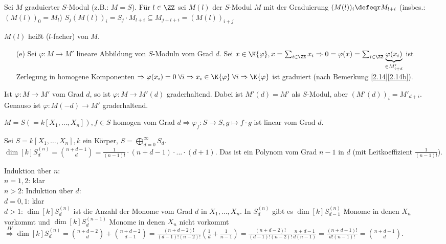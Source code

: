 \begin{nnBsp}
Sei $M$ graduierter $S$-Modul (z.B.: $M=S$). Für $l\in\ZZ$ sei
$M(l)$ der $S$-Modul $M$ mit der Graduierung $(M(l))_i\defeqr M_{l+i}$
(insbes.: $(M(l))_0=M_l$)
$S_j(M(l))_i=S_j\cdot M_{l+i}\subseteq M_{j+l+i}=(M(l))_{i+j}$

$M(l)$ heißt ($l$-facher)  von $M$.
\end{nnBsp}

\begin{Bew}
  \begin{enumerate}
    \item[(e)] Sei $\varphi: M \to M'$ lineare Abbildung von $S$-Moduln vom Grad
    $d$. Sei $x \in \K{\varphi}, x = \sum_{i \in \ZZ} x_i
    \Rightarrow 0 = \varphi(x) = \sum_{i \in \ZZ} \underset{\in M'_{i +
    d}}{\underbrace{\varphi(x_i)}}$ ist Zerlegung in homogene Komponenten
    $\Rightarrow \varphi(x_i) = 0 \; \forall i \Rightarrow x_i \in \K{\varphi} \; \forall i \Rightarrow \K{\varphi}$ ist graduiert
    (nach Bemerkung \ref{2.14}\ref{2.14b}).
  \end{enumerate}
\end{Bew}

\begin{Beo}
  Ist $\varphi: M \to M'$ vom Grad $d$, so ist $\varphi: M \to M'(d)$
  graderhaltend. Dabei ist $M'(d) = M'$ als $S$-Modul, aber $(M'(d))_i = M'_{d
  +i}$. Genauso ist $\varphi: M(-d) \to M'$ graderhaltend.
\end{Beo}

\begin{nnBsp}
  $M = S (=k[X_1, \dots, X_n]), f \in S$ homogen vom Grad $d \Rightarrow
  \varphi_f: S \to S, g \mapsto f \cdot g$ ist linear vom Grad $d$.
\end{nnBsp}

\begin{Prop}
  Sei $S = k[X_1, \dots, X_n], k$ ein Körper, $S = \bigoplus_{d = 0}^{\infty} S_d$.\\
  $\dim[k]{S_d^{(n)}} = \binom{n+d-1}{d} = \frac{1}{(n-1)!} \cdot (n+d-1)
  \cdot ... 
  \cdot (d+1)$. Das ist ein Polynom vom Grad $n-1$ in $d$ (mit Leitkoeffizient
  $\frac{1}{(n-1)!}$).
\end{Prop}

\begin{Bew}
  Induktion über $n$:\\
  $n=1,2$: klar\\
  $n>2$:  Induktion über $d$:\\
  $d=0,1$: klar\\
  $d>1$: $\dim[k]{S_d^{(n)}}$ ist die Anzahl der Monome vom Grad $d$ in $X_1, \dots,
  X_n$. In $S_d^{(n)}$ gibt es $\dim[k]{S_{d-1}^{(n)}}$ Monome in denen $X_n$ vorkommt und $\dim[k]{S_d^{(n-1)}}$ Monome in denen $X_n$ nicht
  vorkommt $\overset{IV}{\Rightarrow}
  \dim[k]{S_d^{(n)}} = \binom{n+d-2}{d} +
  \binom{n+d-2}{d-1} = \frac{(n+d-2)!}{(d-1)! (n-2)!} (\frac{1}{d} + \frac{1}{n-1}) =
  \frac{(n+d-2)!}{(d-1)! (n-2)!} \frac{n+d-1}{d(n-1)} = \frac{(n+d-1)!}{d!
  (n-1)!} = \binom{n+d-1}{d}$.
\end{Bew}


